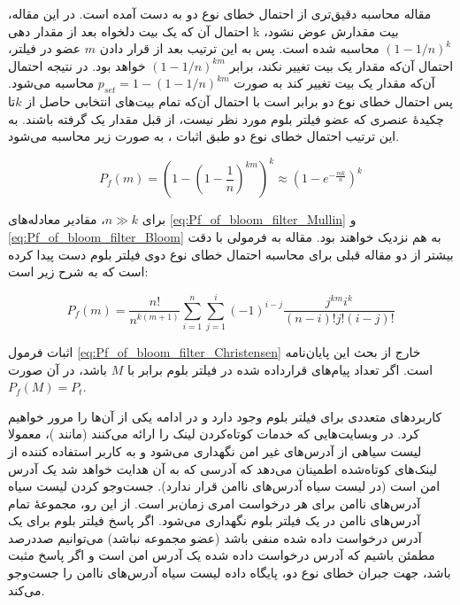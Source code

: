 مقاله \cite{Mullin1983} محاسبه دقیق‌تری از احتمال خطای نوع دو به دست آمده است. در این مقاله، احتمال آن که یک بیت دلخواه بعد از مقدار دهی k بیت مقدارش عوض نشود،
$(1-1/n)^k$
محاسبه شده است. پس به این ترتیب بعد از قرار دادن $m$ عضو در فیلتر، احتمال آن‌که مقدار یک بیت تغییر نکند، برابر 
$(1-1/n)^{km}$
خواهد بود. در نتیجه احتمال آن‌که مقدار یک بیت تغییر کند به صورت 
$p_{set} = 1-(1-1/n)^{km}$
محاسبه می‌شود. پس احتمال خطای نوع دو برابر است با احتمال آن‌که تمام بیت‌های انتخابی حاصل از $k$تا چکیدهٔ عنصری که عضو فیلتر بلوم مورد نظر نیست،‌ از قبل مقدار یک گرفته باشند. به این ترتیب احتمال خطای نوع دو طبق اثبات \cite{Mullin1983}، به صورت زیر محاسبه می‌شود.

\begin{equation}
P_f(m) = \left(1-\left(1-\frac{1}{n}\right)^{km}\right)^k \approx \left(1-e^{-\frac{mk}{n}}\right)^k
\label{eq:Pf_of_bloom_filter_Mullin}
\end{equation}

برای $n\gg k$، مقادیر معادله‌های  \eqref{eq:Pf_of_bloom_filter_Mullin} و \eqref{eq:Pf_of_bloom_filter_Bloom} به هم نزدیک خواهند بود. مقاله \cite{Christensen2010} به فرمولی با دقت بیشتر از دو مقاله قبلی برای محاسبه احتمال خطای نوع دوی فیلتر بلوم دست پیدا کرده است که به شرح زیر است:

\begin{equation}
P_f(m) = \frac{n!}{n^{k(m+1)}} \sum_{i=1}^{n} \sum_{j=1}^{i} (-1)^{i-j} \frac{j^{km}i^k}{(n-i)!j!(i-j)!}
\label{eq:Pf_of_bloom_filter_Christensen}
\end{equation}


اثبات فرمول \eqref{eq:Pf_of_bloom_filter_Christensen} خارج از بحث این پایان‌نامه است. اگر تعداد پیام‌های قرارداده شده در فیلتر بلوم برابر با $M$ باشد، در آن صورت 
$P_f(M)=P_t$.


کاربرد‌های متعددی برای فیلتر بلوم وجود دارد و در ادامه یکی از آن‌ها را مرور خواهیم کرد. در وبسایت‌هایی که خدمات کوتاه‌کردن لینک را ارائه می‌کنند (مانند \cite{Bitly.comTeam2020})، معمولا لیست سیاهی از آدرس‌های غیر امن نگهداری می‌شود و به کاربر استفاده کننده از لینک‌های کوتاه‌شده اطمینان می‌دهد که آدرسی که به آن هدایت خواهد شد یک آدرس امن است (در لیست سیاه آدرس‌های ناامن قرار ندارد). جست‌وجو کردن لیست سیاه آدرس‌های ناامن برای هر درخواست امری زمان‌بر است. از این رو، مجموعهٔ تمام آدرس‌های ناامن در یک فیلتر بلوم نگهداری می‌شود. اگر پاسخ فیلتر بلوم برای یک آدرس درخواست داده شده منفی باشد (عضو مجموعه نباشد) می‌توانیم صددرصد مطمئن باشیم که آدرس در‌خواست داده شده یک آدرس امن است و اگر پاسخ مثبت باشد،‌ جهت جبران خطای نوع دو، پایگاه‌ داده لیست سیاه آدرس‌های ناامن را جست‌وجو می‌کند\cite{Azar2016}.

